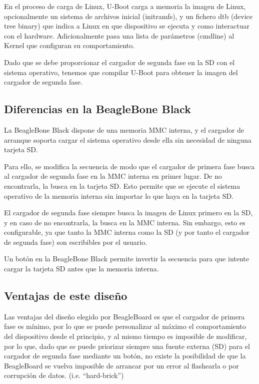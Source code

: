 \documentclass{tfg}
\begin{document}
En el proceso de carga de Linux, U-Boot carga a memoria la imagen de Linux, opcionalmente un sistema de archivos inicial (initramfs), y un fichero dtb (device tree binary) que indica a Linux en que dispositivo se ejecuta y como interactuar con el hardware. Adicionalmente pasa una lista de parámetros (cmdline) al Kernel que configuran su comportamiento.

Dado que se debe proporcionar el cargador de segunda fase en la SD con el sistema operativo, tenemos que compilar U-Boot para obtener la imagen del cargador de segunda fase.

\subsection{Diferencias en la BeagleBone Black}
La BeagleBone Black dispone de una memoria MMC interna, y el cargador de arranque soporta cargar el sistema operativo desde ella sin necesidad de ninguna tarjeta SD.

Para ello, se modifica la secuencia de modo que el cargador de primera fase busca al cargador de segunda fase en la MMC interna en primer lugar. De no encontrarla, la busca en la tarjeta SD. Esto permite que se ejecute el sistema operativo de la memoria interna sin importar lo que haya en la tarjeta SD.

El cargador de segunda fase siempre busca la imagen de Linux primero en la SD, y en caso de no encontrarla, la busca en la MMC interna. Sin embargo, esto es configurable, ya que tanto la MMC interna como la SD (y por tanto el cargador de segunda fase) son escribibles por el usuario.

Un botón en la BeagleBone Black permite invertir la secuencia para que intente cargar la tarjeta SD antes que la memoria interna.

\subsection{Ventajas de este diseño}
Las ventajas del diseño elegido por BeagleBoard es que el cargador de primera fase es mínimo, por lo que se puede personalizar al máximo el comportamiento del dispositivo desde el principio, y al mismo tiempo es imposible de modificar, por lo que, dado que se puede priorizar siempre una fuente externa (SD) para el cargador de segunda fase mediante un botón, no existe la posibilidad de que la BeagleBoard se vuelva imposible de arrancar por un error al flashearla o por corrupción de datos. (i.e. ``hard-brick'')
\end{document}
